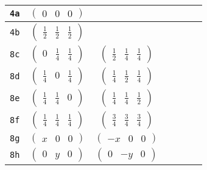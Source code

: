 \documentclass[fleqn,9pt,landscape]{jsarticle}
\begin{document}
\begin{center}
\begin{longtable}{ccccccc}
{\tt 4a} & $ \begin{pmatrix} 0 & 0 & 0 \end{pmatrix} $ & $  $ & $  $ & $  $ & $  $ & $  $ \\ \hline
{\tt 4b} & $ \begin{pmatrix} \frac{1}{2} & \frac{1}{2} & \frac{1}{2} \end{pmatrix} $ & $  $ & $  $ & $  $ & $  $ & $  $ \\ \hline
{\tt 8c} & $ \begin{pmatrix} 0 & \frac{1}{4} & \frac{1}{4} \end{pmatrix} $ & $ \begin{pmatrix} \frac{1}{2} & \frac{1}{4} & \frac{1}{4} \end{pmatrix} $ & $  $ & $  $ & $  $ & $  $ \\ \hline
{\tt 8d} & $ \begin{pmatrix} \frac{1}{4} & 0 & \frac{1}{4} \end{pmatrix} $ & $ \begin{pmatrix} \frac{1}{4} & \frac{1}{2} & \frac{1}{4} \end{pmatrix} $ & $  $ & $  $ & $  $ & $  $ \\ \hline
{\tt 8e} & $ \begin{pmatrix} \frac{1}{4} & \frac{1}{4} & 0 \end{pmatrix} $ & $ \begin{pmatrix} \frac{1}{4} & \frac{1}{4} & \frac{1}{2} \end{pmatrix} $ & $  $ & $  $ & $  $ & $  $ \\ \hline
{\tt 8f} & $ \begin{pmatrix} \frac{1}{4} & \frac{1}{4} & \frac{1}{4} \end{pmatrix} $ & $ \begin{pmatrix} \frac{3}{4} & \frac{3}{4} & \frac{3}{4} \end{pmatrix} $ & $  $ & $  $ & $  $ & $  $ \\ \hline
{\tt 8g} & $ \begin{pmatrix} x & 0 & 0 \end{pmatrix} $ & $ \begin{pmatrix} - x & 0 & 0 \end{pmatrix} $ & $  $ & $  $ & $  $ & $  $ \\ \hline
{\tt 8h} & $ \begin{pmatrix} 0 & y & 0 \end{pmatrix} $ & $ \begin{pmatrix} 0 & - y & 0 \end{pmatrix} $ & $  $ & $  $ & $  $ & $  $ \\ \hline

\end{longtable}
\end{center}
\end{document}
